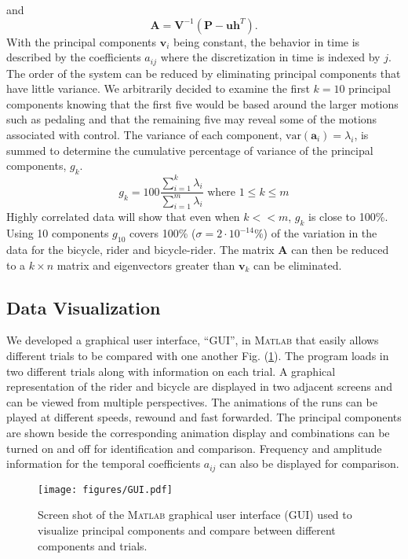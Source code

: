 \documentclass[smallextended]{svjour3}     %
\begin{document}
and
\begin{equation}
    \mathbf{A}=\mathbf{V}^{-1}(\mathbf{P}-\mathbf{u}\mathbf{h}^T)\textrm{.}
\end{equation}
With the principal components $\mathbf{v}_i$ being constant, the behavior in
time is described by the coefficients $a_{ij}$ where the discretization in time
is indexed by $j$. The order of the system can be reduced by eliminating
principal components that have little variance. We arbitrarily decided to
examine the first $k=10$ principal components knowing that the first five would
be based around the larger motions such as pedaling and that the remaining five
may reveal some of the motions associated with control. The variance of each
component, $\textrm{var}(\mathbf{a}_i)=\lambda_i$, is summed to determine the
cumulative percentage of variance of the principal components, $g_k$.
\begin{equation}
    g_k=100\frac{\sum_{i=1}^k\lambda_i}{\sum_{i=1}^m\lambda_i}\textrm{ where }1\leq k\leq m
\end{equation}
Highly correlated data will show that even when $k<<m$, $g_k$ is close to
100\%. Using 10 components $g_{10}$ covers 100\% ($\sigma=2\cdot10^{-14}$\%) of
the variation in the data for the bicycle, rider and bicycle-rider. The matrix
$\mathbf{A}$ can then be reduced to a $k\times n$ matrix and eigenvectors
greater than $\mathbf{v}_k$ can be eliminated.

\subsection{Data Visualization}
\label{sec:dataVis}
We developed a graphical user interface, ``GUI'',  in \textsc{Matlab} that easily allows
different trials to be compared with one another Fig. (\ref{fig:GUI}). The
program loads in two different trials along with information on each trial. A
graphical representation of the rider and bicycle are displayed in two adjacent
screens and can be viewed from multiple perspectives. The animations of the
runs can be played at different speeds, rewound and fast forwarded. The
principal components are shown beside the corresponding animation display and
combinations can be turned on and off for identification and comparison.
Frequency and amplitude information for the temporal coefficients $a_{ij}$ can
also be displayed for comparison.
\begin{figure}[tbp]
    \begin{center}
        \texttt{[image: figures/GUI.pdf]}
    \end{center}
    \caption{Screen shot of the \textsc{Matlab} graphical user interface (GUI)
    used to visualize principal components and compare between different
    components and trials.}
    \label{fig:GUI}
\end{figure}
\end{document}
